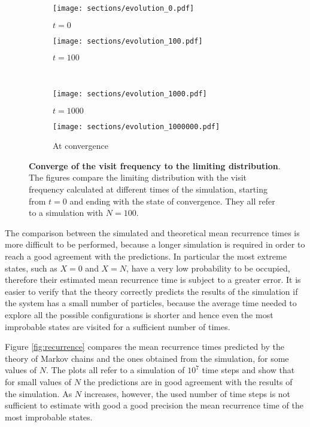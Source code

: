 \begin{figure}
  \begin{subfigure}{.5\textwidth}
      \centering
      \texttt{[image: sections/evolution\_0.pdf]}
      \caption{$t = 0$}
    \end{subfigure}
    \begin{subfigure}{.5\textwidth}
      \centering
      \texttt{[image: sections/evolution\_100.pdf]}
      \caption{$t = 100$}
    \end{subfigure}\\
    \begin{subfigure}{0.5\textwidth}
      \centering
      \texttt{[image: sections/evolution\_1000.pdf]}
      \caption{$t = 1000$}
    \end{subfigure}%
    \begin{subfigure}{0.5\textwidth}
      \centering
      \texttt{[image: sections/evolution\_1000000.pdf]}
      \caption{At convergence}
    \end{subfigure}

  \captionsetup{width=.9\linewidth}
  \caption{\textbf{Converge of the visit frequency to the limiting distribution}. The figures compare the limiting distribution with the visit frequency calculated at different times of the simulation, starting from $t = 0$ and ending with the state of convergence. They all refer to a simulation with $N = 100$.}
  \label{fig:evolution}
\end{figure}

The comparison between the simulated and theoretical mean recurrence times is more difficult to be performed, because a longer simulation is required in order to reach a good agreement with the predictions. In particular the most extreme states, such as $X = 0$ and $X = N$, have a very low probability to be occupied, therefore their estimated mean recurrence time is subject to a greater error. It is easier to verify that the theory correctly predicts the results of the simulation if the system has a small number of particles, because the average time needed to explore all the possible configurations is shorter and hence even the most improbable states are visited for a sufficient number of times. 

Figure \ref{fig:recurrence} compares the mean recurrence times predicted by the theory of Markov chains and the ones obtained from the simulation, for some values of $N$. The plots all refer to a simulation of $10^7$ time steps and show that for small values of $N$ the predictions are in good agreement with the results of the simulation. As $N$ increases, however, the used number of time steps is not sufficient to estimate with good a good precision the mean recurrence time of the most improbable states. 

